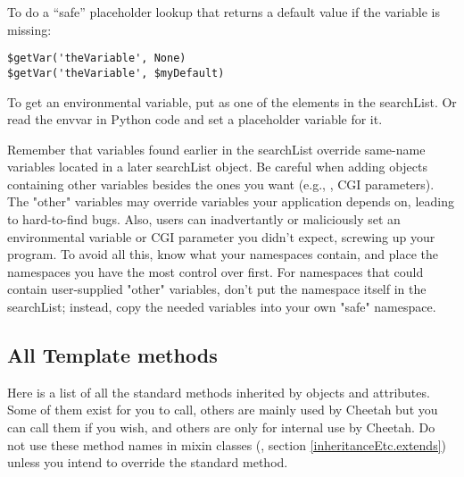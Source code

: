 To do a ``safe'' placeholder lookup that returns a default value if the
variable is missing:
\begin{verbatim}
$getVar('theVariable', None)
$getVar('theVariable', $myDefault)
\end{verbatim}

To get an environmental variable, put  as one of the
elements in the searchList.  Or read the envvar in Python code and set a
placeholder variable for it.

Remember that variables found earlier in the searchList override same-name
variables located in a later searchList object.  Be careful when adding objects
containing other variables besides the ones you want (e.g., ,
CGI parameters).  The "other" variables may override variables your application
depends on, leading to hard-to-find bugs.  Also, users can inadvertantly or
maliciously set an environmental variable or CGI parameter you didn't expect,
screwing up your program.  To avoid all this, know what your namespaces
contain, and place the namespaces you have the most control over first.  For
namespaces that could contain user-supplied "other" variables, don't put the
namespace itself in the searchList; instead, copy the needed variables into
your own "safe" namespace.


\subsection{All Template methods}
\label{tips.allMethods}

Here is a list of all the standard methods inherited by  objects
and attributes.  Some of them exist for you to call, others are mainly used by
Cheetah but you can call them if you wish, and others are only for internal use
by Cheetah.  Do not use these method names in mixin classes (,
section \ref{inheritanceEtc.extends}) unless you intend to override the
standard method.  

